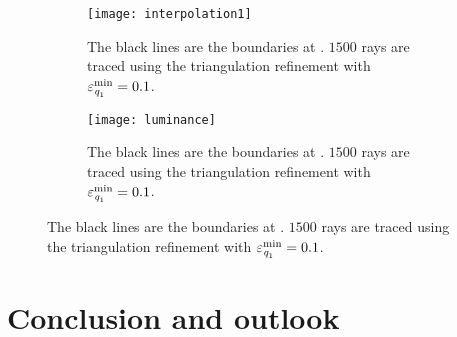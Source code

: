 \begin{figure}[h!]
\centering
\begin{subfigure}{.45\textwidth}
  \texttt{[image: interpolation1]}
 \caption{The black lines are the boundaries at . $1500$ rays are traced using the triangulation refinement with $\varepsilon_{\textit{q}_1}^{\textrm{min}}=0.1$. }
  \label{fig:boundaries_s2}
\end{subfigure}%
\hfill
\begin{subfigure}{.45\textwidth}
  \texttt{[image: luminance]}
  \caption{The black lines are the boundaries at . $1500$ rays are traced using the triangulation refinement with $\varepsilon_{\textit{q}_1}^{\textrm{min}}=0.1$.} %
  \label{fig:boundaries_t2}
\end{subfigure} %
\end{figure}
\section{Conclusion and outlook}